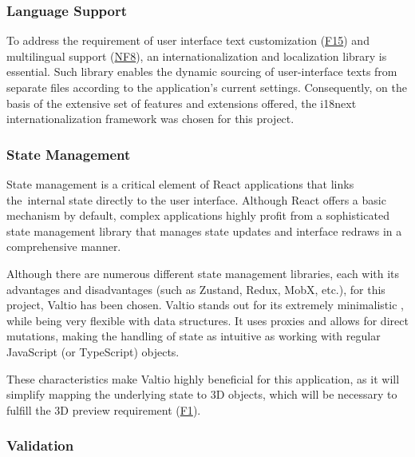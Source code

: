 \subsubsection{Language Support} \label{section:i18n}

To address the requirement of user interface text customization (\hyperref[itm:F15]{F15}) and multilingual support (\hyperref[itm:NF8]{NF8}), an internationalization and localization library is essential. Such library enables the dynamic sourcing of user-interface texts from separate files according to the application's current settings. Consequently, on the basis of the extensive set of features and extensions offered, the i18next internationalization framework was chosen for this project.~\cite{Krukowski2023}

\subsubsection{State Management}

State management is a critical element of React applications that links the~internal state directly to the user interface. Although React offers a basic mechanism by default, complex applications highly profit from a sophisticated state management library that manages state updates and interface redraws in a comprehensive manner.~\cite{Ceddia2021}

Although there are numerous different state management libraries, each with its advantages and disadvantages (such as Zustand, Redux, MobX, etc.), for this project, Valtio has been chosen. Valtio stands out for its extremely minimalistic , while being very flexible with data structures. It uses proxies and allows for direct mutations, making the handling of state as intuitive as working with regular JavaScript (or TypeScript) objects.~\cite{Adepoju2023}

These characteristics make Valtio highly beneficial for this application, as it will simplify mapping the underlying state to 3D objects, which will be necessary to fulfill the 3D preview requirement (\hyperref[itm:F1]{F1}).

\subsubsection{Validation} \label{section:zod}


